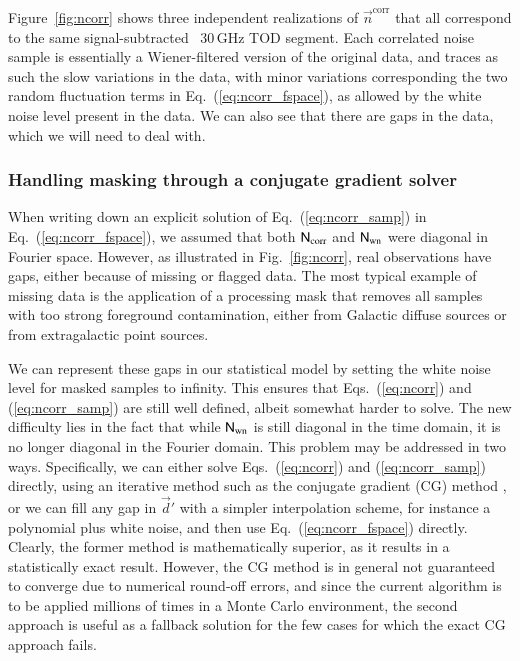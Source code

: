 \documentclass[twocolumn]{aa}
\begin{document}
Figure~\ref{fig:ncorr} shows three independent
realizations of $\vec{n}^\mathrm{corr}$ that all correspond to the
same signal-subtracted \Planck\ 30\,GHz TOD segment. Each correlated
noise sample is essentially a Wiener-filtered version of the original
data, and traces as such the slow variations in the data, with minor
variations corresponding the two random fluctuation terms in
Eq.~(\ref{eq:ncorr_fspace}), as allowed by the white noise level
present in the data. We can also see that there are gaps in the data, 
which we will need to deal with. 

\subsubsection{Handling masking through a conjugate gradient solver}
When writing down an explicit solution of Eq.~(\ref{eq:ncorr_samp}) in
Eq.~(\ref{eq:ncorr_fspace}), we assumed that both
$\mathsf{N}_\mathrm{corr}$ and $\mathsf{N}_\mathrm{wn}$ were diagonal in
Fourier space. However, as illustrated in Fig.~\ref{fig:ncorr}, real
observations have gaps, either because of missing or flagged data. The
most typical example of missing data is the application of a
processing mask that removes all samples with too strong foreground
contamination, either from Galactic diffuse sources or from
extragalactic point sources.

We can represent these gaps in our statistical model by setting the
white noise level for masked samples to infinity. This ensures that
Eqs.~(\ref{eq:ncorr}) and (\ref{eq:ncorr_samp}) are still well
defined, albeit somewhat harder to solve. The new difficulty lies in
the fact that while $\mathsf{N}_\mathrm{wn}$ is still diagonal in
the time domain, it is no longer diagonal in the Fourier domain. This problem
may be addressed in two ways. Specifically, we can either solve
Eqs.~(\ref{eq:ncorr}) and (\ref{eq:ncorr_samp}) directly, using an
iterative method such as the conjugate gradient (CG) method
\citep{wehus:2012,bp02}, or we can fill any gap in $\vec{d}'$ with a
simpler interpolation scheme, for instance a polynomial plus white
noise, and then use Eq.~(\ref{eq:ncorr_fspace}) directly. Clearly,
the former method is mathematically superior, as it results in a
statistically exact result. However, the CG method is in general not
guaranteed to converge due to numerical round-off errors, and since the 
current algorithm is to be
applied millions of times in a Monte Carlo environment, the second
approach is useful as a fallback solution for the few cases for which the
exact CG approach fails. 
\end{document}
